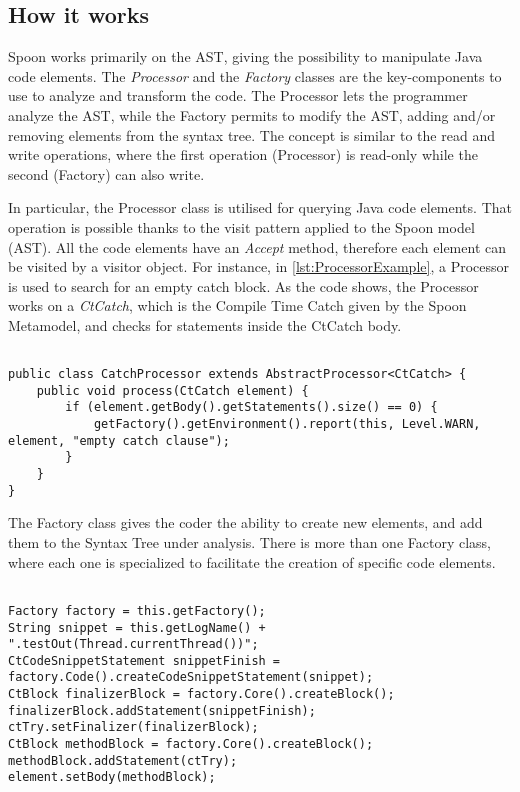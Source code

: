 \subsection*{How it works}\label{subsec:howSpoon}
Spoon works primarily on the AST, giving the possibility to manipulate Java code elements. The \emph{Processor} and the \emph{Factory} classes are the key-components to use to analyze and transform the code. The Processor lets the programmer analyze the AST, while the Factory permits to modify the AST, adding and/or removing elements from the syntax tree. The concept is similar to the read and write operations, where the first operation (Processor) is read-only while the second (Factory) can also write.

In particular, the Processor class is utilised for querying Java code elements. That operation is possible thanks to the visit pattern applied to the Spoon model (AST). All the code elements have an \emph{Accept} method, therefore each element can be visited by a visitor object. For instance, in \autoref{lst:ProcessorExample}, a Processor is used to search for an empty catch block. As the code shows, the Processor works on a \textit{CtCatch}, which is the Compile Time Catch given by the Spoon Metamodel, and checks for statements inside the CtCatch body.

\begin{lstlisting}[caption={Processor example taken from \href{http://spoon.gforge.inria.fr/processor.html}{Spoon documentation}},label={lst:ProcessorExample}]% Start your code-block

public class CatchProcessor extends AbstractProcessor<CtCatch> {
	public void process(CtCatch element) {
		if (element.getBody().getStatements().size() == 0) {
			getFactory().getEnvironment().report(this, Level.WARN, element, "empty catch clause");
		}
	}
}
\end{lstlisting}

The Factory class gives the coder the ability to create new elements, and add them to the Syntax Tree under analysis. There is more than one Factory class, where each one is specialized to facilitate the creation of specific code elements.

\begin{lstlisting}[caption={Factory example taken from \href{https://www.programcreek.com/java-api-examples/index.php?api=spoon.reflect.factory.Factory}{Spoon Projects}},label={lst:FactoryExample}]% Start your code-block

Factory factory = this.getFactory();
String snippet = this.getLogName() + ".testOut(Thread.currentThread())";
CtCodeSnippetStatement snippetFinish = factory.Code().createCodeSnippetStatement(snippet);
CtBlock finalizerBlock = factory.Core().createBlock();
finalizerBlock.addStatement(snippetFinish);
ctTry.setFinalizer(finalizerBlock);
CtBlock methodBlock = factory.Core().createBlock();
methodBlock.addStatement(ctTry);
element.setBody(methodBlock);
\end{lstlisting}

